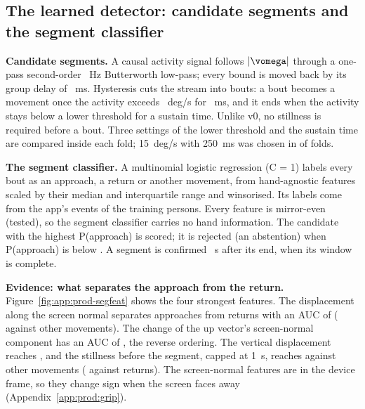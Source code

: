 \subsection{The learned detector: candidate segments and the segment classifier}\label{app:prod:detector}

\textbf{Candidate segments.}
A causal activity signal follows $|\vomega|$ through a one-pass second-order ~Hz Butterworth low-pass; every bound is moved back by its group delay of ~ms.
Hysteresis cuts the stream into bouts: a bout becomes a movement once the activity exceeds ~deg/s for ~ms, and it ends when the activity stays below a lower threshold for a sustain time.
Unlike v0, no stillness is required before a bout.
Three settings of the lower threshold and the sustain time are compared inside each fold; 15~deg/s with 250~ms was chosen in  of  folds.

\textbf{The segment classifier.}
A multinomial logistic regression (C = 1) labels every bout as an approach, a return or another movement, from hand-agnostic features scaled by their median and interquartile range and winsorised.
Its labels come from the app's events of the training persons.
Every feature is mirror-even (tested), so the segment classifier carries no hand information.
The candidate with the highest P(approach) is scored; it is rejected (an abstention) when P(approach) is below .
A segment is confirmed ~s after its end, when its window is complete.

\textbf{Evidence: what separates the approach from the return.}
Figure~\ref{fig:app:prod-segfeat} shows the four strongest features.
The displacement along the screen normal separates approaches from returns with an AUC of  ( against other movements).
The change of the up vector's screen-normal component has an AUC of , the reverse ordering.
The vertical displacement reaches , and the stillness before the segment, capped at 1~s, reaches  against other movements ( against returns).
The screen-normal features are in the device frame, so they change sign when the screen faces away (Appendix~\ref{app:prod:grip}).

